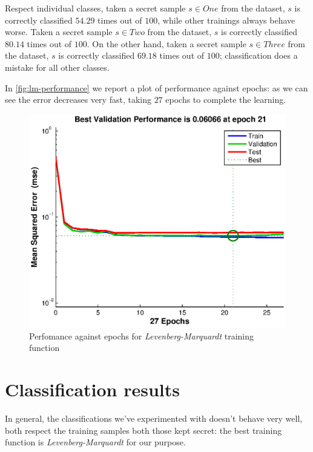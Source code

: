 \documentclass[10pt,a4paper]{article}
\begin{document}
    Respect individual classes, taken a secret sample $s \in One$ from the dataset, 
    $s$ is correctly classified $54.29$ times out of $100$, while other trainings always behave worse. 
    Taken a secret sample $s \in Two$ from the dataset, $s$ is correctly classified $80.14$ times out of $100$. 
    On the other hand, taken a secret sample $s \in Three$ from the dataset, $s$ is correctly classified $69.18$ times out of $100$;
    classification does a mistake for all other classes.

    In \autoref{fig:lm-performance} we report a plot of performance against epochs: as we can
    see the error decreases very fast, taking $27$ epochs to complete the learning.

    \begin{figure}
    \centering
    \includegraphics[scale=0.7]{eps/lm-performance.eps}
    \caption{Perfomance against epochs for \emph{Levenberg-Marquardt} training function}
    \label{fig:lm-performance}
    \end{figure}

    \section{Classification results}
    
    In general, the classifications we've experimented with doesn't behave very
    well, both respect the training samples both those kept secret: the 
    best training function is \emph{Levenberg-Marquardt} for our purpose.
\end{document}
